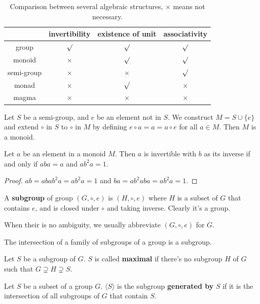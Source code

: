 \documentclass[12pt]{book}
\begin{document}
	\begin{table}[htp]\centering
		\begin{tabular}{|c|c|c|c|}
			\hline
			&invertibility&existence of unit&associativity\\ \hline	
			group&$\surd$&$\surd$&$\surd$\\ \hline
			monoid&$\times$&$\surd$&$\surd$\\ \hline
			semi-group&$\times$&$\times$&$\surd$\\ \hline
			monad&$\times$&$\surd$&$\times$\\ \hline
			magma&$\times$&$\times$&$\times$\\ \hline
		\end{tabular}
		\caption{Comparison between several algebraic structures, $\times$ means not necessary.}
		\label{tab:structures}
	\end{table}
	\begin{lemma}
		Let $S$ be a semi-group, and $e$ be an element not in $S$. We construct $M=S\cup\{e\}$ and extend $\circ$ in $S$ to $\circ$ in $M$ by defining $e\circ a=a=a\circ e$ for all $a\in M$. Then $M$ is a monoid.
	\end{lemma}
	\begin{lemma}
		Let $a$ be an element in a monoid $M$. Then $a$ is invertible with $b$ as its inverse if and only if $aba=a$ and $ab^2a=1$.
	\end{lemma}
	\begin{proof}
		$ab=abab^2a=ab^2a=1$ and $ba=ab^2aba=ab^2a=1$.
	\end{proof}
\begin{definition}
	A \textbf{subgroup} of group $(G,\circ,e)$ is $(H,\circ,e)$ where $H$ is a subset of $G$ that contains $e$, and is closed under $\circ$ and taking inverse. Clearly it's a group.
\end{definition}
	
When their is no ambiguity, we usually abbreviate $(G,\circ,e)$ for $G$.

\begin{lemma}
	The intersection of a family of subgroups of a group is a subgroup.
\end{lemma}

\begin{definition}
	Let $S$ be a subgroup of $G$. $S$ is called {\bf maximal} if there's no subgroup $H$ of $G$ such that $G\supsetneq H\supsetneq S$.
\end{definition}
	
\begin{definition}
	Let $S$ be a subset of a group $G$. $\langle S\rangle$ is the subgroup {\bf generated by} $S$ if it is the intersection of all subgroups of $G$ that contain $S$.
\end{definition}
\end{document}
